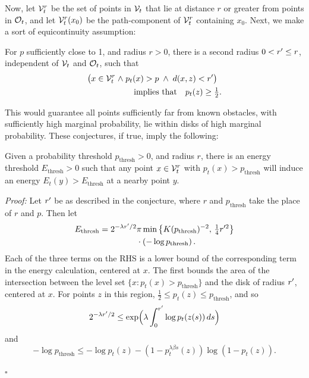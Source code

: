 \bigskip
Now, let $\mathcal{V}_t^r$ be the set of points in $\mathcal{V}_t$ that lie at distance $r$ or greater from points in $\mathcal{O}_t$, and let $\mathcal{V}_t^r(x_0)$ be the path-component of $\mathcal{V}_t^r$ containing $x_0$.  Next, we make a sort of equicontinuity assumption:
\begin{conj}
For $p$ sufficiently close to 1, and radius $r>0$, there is a second radius $0<r^{\prime}\leq r$, independent of $\mathcal{V}_t$ and $\mathcal{O}_t$,
such that 
\begin{align*}
\bigl(x\in\mathcal{V}_t^r \;\wedge\;&
p_t(x)>p \;\wedge\;
d(x,z)<r^{\prime}\bigr)\\
&\quad\text{implies that}\quad p_t(z)\geq\tfrac{1}{2}.
\end{align*}
\end{conj}
This would guarantee all points sufficiently far from known obstacles, with sufficiently high marginal probability, lie within disks of high marginal probability.  These conjectures, if true, imply the following:

\begin{lemma}
Given a probability threshold $p_{\text{thresh}}>0$, and radius $r$, there is an energy threshold $E_{\text{thresh}}>0$ such that any point $x\in\mathcal{V}_t^r$ with $p_t(x)>p_{\text{thresh}}$ will
induce an energy $E_t(y)>E_{\text{thresh}}$ at a nearby point $y$.
\end{lemma}
\emph{Proof:}
Let $r^{\prime}$ be as described in the conjecture, where $r$ and $p_{\text{thresh}}$ take the place of $r$ and $p$.  Then let
\begin{align*}
E_{\text{thresh}} =  
2^{-\lambda r\1/2}&
\pi \min\left\{K(p_{\text{thresh}})^{-2},\,\tfrac{1}{4}r^{\prime 2}\right\}\\
&\cdot\left(-\log p_{\text{thresh}}\right).%
\end{align*}
Each of the three terms on the RHS is a lower bound of the corresponding term in the energy calculation, centered at $x$.  The first bounds the area of the intersection 
between the level set $\{x:p_t(x)>p_{\text{thresh}}\}$ 
and the disk of radius $r^{\prime}$, centered at $x$.
For points $z$ in this region, $\frac{1}{2} \leq p_t(z) \leq p_{\text{thresh}}$, and so
$$2^{-\lambda r^{\prime}/2}\leq\exp\Bigl(\lambda\int_0^{r^{\prime}} \log p_t(z(s))\,ds\Bigr)$$
and
$$-\log p_{\text{thresh}}\leq-\log p_t(z) -(1-p_t^{\lambda\beta s}(z)) \log (1-p_t(z)).$$
\begin{flushright}
{$\square$}
\end{flushright}


